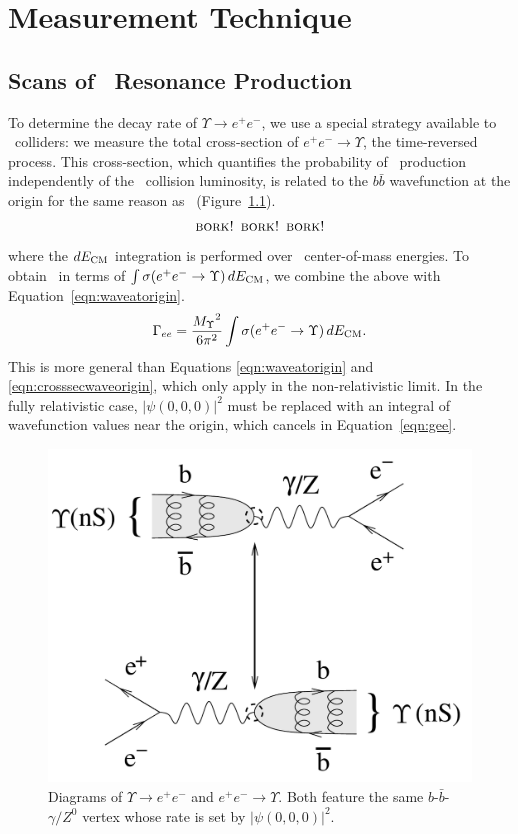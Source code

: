 \documentclass{cornell}
\begin{document}
\chapter{Measurement Technique}
\label{chp:technique}

\section{Scans of \boldmath \ups\ Resonance Production}

To determine the decay rate of $\Upsilon \to e^+e^-$, we use a special
strategy available to \ee\ colliders: we measure the total
cross-section of $e^+e^- \to \Upsilon$, the time-reversed process.
This cross-section, which quantifies the probability of \ups\
production independently of the \ee\ collision luminosity, is related
to the $b\bar{b}$ wavefunction at the origin for the same reason as
\gee\ (Figure~\ref{timereversed}).
\begin{equation}
  \mbox{\sc bork! bork! bork!}
  \label{eqn:crosssecwaveorigin}
\end{equation}
where the $dE_{\mbox{\scriptsize CM}}$ integration is performed over \ee\
center-of-mass energies.  To obtain \gee\ in terms of $\int
\sigma(e^+e^- \to \Upsilon) \, dE_{\mbox{\scriptsize CM}}$, we combine the above
with Equation~\ref{eqn:waveatorigin}.
\begin{equation}
  \Gamma_{ee} = \frac{{M_\Upsilon}^2}{6\pi^2} \int \sigma(e^+e^- \to
  \Upsilon) \, dE_{\mbox{\scriptsize CM}} \mbox{.}
  \label{eqn:gee}
\end{equation}
This is more general than Equations \ref{eqn:waveatorigin} and
\ref{eqn:crosssecwaveorigin}, which only apply in the non-relativistic
limit.  In the fully relativistic case, $|\psi(0,0,0)|^2$ must be
replaced with an integral of wavefunction values near the origin,
which cancels in Equation~\ref{eqn:gee}.

\begin{figure}[p]
  \begin{center}
    \includegraphics[width=0.6\linewidth]{plots/timereversed}
  \end{center}
  \caption{\label{timereversed} Diagrams of $\Upsilon \to e^+e^-$ and
  $e^+e^- \to \Upsilon$.  Both feature the same
  $b$-$\bar{b}$-$\gamma/Z^0$ vertex whose rate is set by
  $|\psi(0,0,0)|^2$.}
\end{figure}
\end{document}

